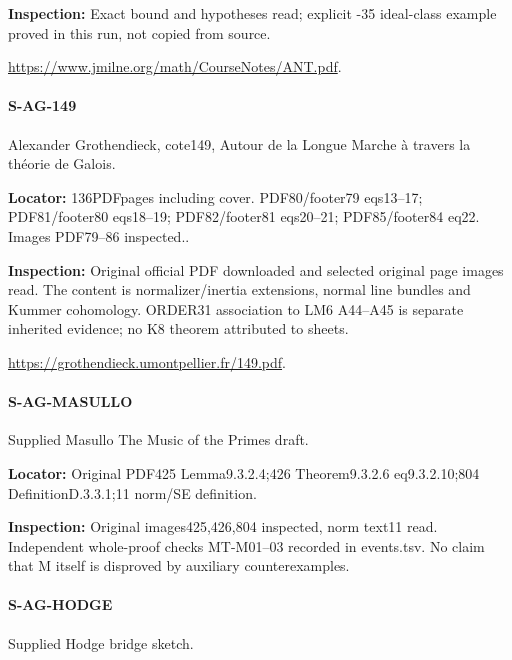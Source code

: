 \documentclass[11pt,a4paper]{article}
\begin{document}
\textbf{Inspection:} Exact bound and hypotheses read; explicit -35 ideal-class example proved in this run, not copied from source.\allowbreak{}

\url{https://www.jmilne.org/math/CourseNotes/ANT.pdf}.

\paragraph{S-AG-149} Alexander Grothendieck, cote149, Autour de la Longue Marche à travers la théorie de Galois.

\textbf{Locator:} 136PDFpages including cover.\allowbreak{} PDF80/\allowbreak{}footer79 eqs13–\allowbreak{}17; PDF81/\allowbreak{}footer80 eqs18–\allowbreak{}19; PDF82/\allowbreak{}footer81 eqs20–\allowbreak{}21; PDF85/\allowbreak{}footer84 eq22.\allowbreak{} Images PDF79–\allowbreak{}86 inspected.\allowbreak{}.

\textbf{Inspection:} Original official PDF downloaded and selected original page images read.\allowbreak{} The content is normalizer/\allowbreak{}inertia extensions, normal line bundles and Kummer cohomology.\allowbreak{} ORDER31 association to LM6 A44–\allowbreak{}A45 is separate inherited evidence; no K8 theorem attributed to sheets.\allowbreak{}

\url{https://grothendieck.umontpellier.fr/149.pdf}.

\paragraph{S-AG-MASULLO} Supplied Masullo The Music of the Primes draft.

\textbf{Locator:} Original PDF425 Lemma9.\allowbreak{}3.\allowbreak{}2.\allowbreak{}4;426 Theorem9.\allowbreak{}3.\allowbreak{}2.\allowbreak{}6 eq9.\allowbreak{}3.\allowbreak{}2.\allowbreak{}10;804 DefinitionD.\allowbreak{}3.\allowbreak{}3.\allowbreak{}1;11 norm/\allowbreak{}SE definition.

\textbf{Inspection:} Original images425,426,804 inspected, norm text11 read.\allowbreak{} Independent whole-proof checks MT-M01–\allowbreak{}03 recorded in events.\allowbreak{}tsv.\allowbreak{} No claim that M itself is disproved by auxiliary counterexamples.\allowbreak{}


\paragraph{S-AG-HODGE} Supplied Hodge bridge sketch.
\end{document}
